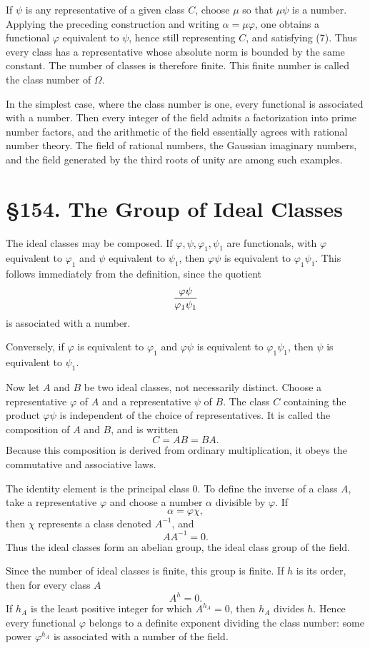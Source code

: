 \documentclass[11pt,a4paper]{book}
\newcommand{\webersection}[2]{\clearpage\section*{\S #1. #2}}
\begin{document}
If \(\psi\) is any representative of a given class \(C\), choose \(\mu\) so that \(\mu\psi\) is a number.  Applying the preceding construction and writing \(\alpha=\mu\varphi\), one obtains a functional \(\varphi\) equivalent to \(\psi\), hence still representing \(C\), and satisfying (7).  Thus every class has a representative whose absolute norm is bounded by the same constant.  The number of classes is therefore finite.  This finite number is called the class number of \(\Omega\).

In the simplest case, where the class number is one, every functional is associated with a number.  Then every integer of the field admits a factorization into prime number factors, and the arithmetic of the field essentially agrees with rational number theory.  The field of rational numbers, the Gaussian imaginary numbers, and the field generated by the third roots of unity are among such examples.

\webersection{154}{The Group of Ideal Classes}

The ideal classes may be composed.  If \(\varphi,\psi,\varphi_1,\psi_1\) are functionals, with \(\varphi\) equivalent to \(\varphi_1\) and \(\psi\) equivalent to \(\psi_1\), then \(\varphi\psi\) is equivalent to \(\varphi_1\psi_1\).  This follows immediately from the definition, since the quotient
\[
 {\varphi\psi\over \varphi_1\psi_1}
\]
is associated with a number.

Conversely, if \(\varphi\) is equivalent to \(\varphi_1\) and \(\varphi\psi\) is equivalent to \(\varphi_1\psi_1\), then \(\psi\) is equivalent to \(\psi_1\).

Now let \(A\) and \(B\) be two ideal classes, not necessarily distinct.  Choose a representative \(\varphi\) of \(A\) and a representative \(\psi\) of \(B\).  The class \(C\) containing the product \(\varphi\psi\) is independent of the choice of representatives.  It is called the composition of \(A\) and \(B\), and is written
\begin{equation}
 C=AB=BA. \tag{1}
\end{equation}
Because this composition is derived from ordinary multiplication, it obeys the commutative and associative laws.

The identity element is the principal class \(0\).  To define the inverse of a class \(A\), take a representative \(\varphi\) and choose a number \(\alpha\) divisible by \(\varphi\).  If
\[
 \alpha=\varphi\chi,
\]
then \(\chi\) represents a class denoted \(A^{-1}\), and
\begin{equation}
 AA^{-1}=0. \tag{2}
\end{equation}
Thus the ideal classes form an abelian group, the ideal class group of the field.

Since the number of ideal classes is finite, this group is finite.  If \(h\) is its order, then for every class \(A\)
\begin{equation}
 A^h=0. \tag{3}
\end{equation}
If \(h_A\) is the least positive integer for which \(A^{h_A}=0\), then \(h_A\) divides \(h\).  Hence every functional \(\varphi\) belongs to a definite exponent dividing the class number: some power \(\varphi^{h_A}\) is associated with a number of the field.
\end{document}
